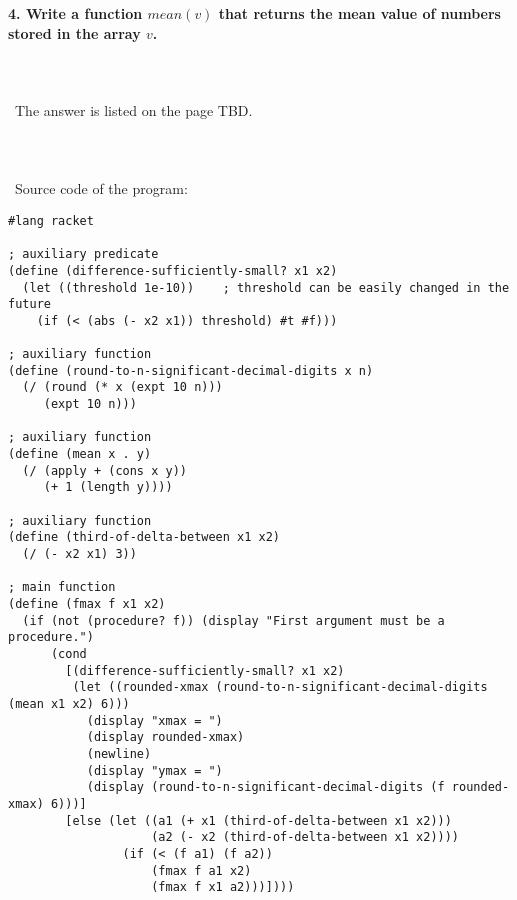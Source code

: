 \documentclass{article}
\begin{document}
\paragraph{}\
\paragraph{}\



\paragraph{4. Write a function \(mean(v)\) that returns the mean value of numbers stored in the array \(v\).}\

\paragraph{}\
	The answer is listed on the page TBD.
\paragraph{}\

\paragraph{}\
Source code of the program:

\begin{verbatim}
#lang racket

; auxiliary predicate
(define (difference-sufficiently-small? x1 x2)
  (let ((threshold 1e-10))    ; threshold can be easily changed in the future
    (if (< (abs (- x2 x1)) threshold) #t #f)))

; auxiliary function
(define (round-to-n-significant-decimal-digits x n)
  (/ (round (* x (expt 10 n)))
     (expt 10 n)))

; auxiliary function
(define (mean x . y)
  (/ (apply + (cons x y))
     (+ 1 (length y))))

; auxiliary function
(define (third-of-delta-between x1 x2)
  (/ (- x2 x1) 3))

; main function
(define (fmax f x1 x2)
  (if (not (procedure? f)) (display "First argument must be a procedure.")
      (cond
        [(difference-sufficiently-small? x1 x2)
         (let ((rounded-xmax (round-to-n-significant-decimal-digits (mean x1 x2) 6)))
           (display "xmax = ")
           (display rounded-xmax)
           (newline)
           (display "ymax = ")
           (display (round-to-n-significant-decimal-digits (f rounded-xmax) 6)))]
        [else (let ((a1 (+ x1 (third-of-delta-between x1 x2)))
                    (a2 (- x2 (third-of-delta-between x1 x2))))
                (if (< (f a1) (f a2))
                    (fmax f a1 x2)
                    (fmax f x1 a2)))])))
\end{verbatim}
\end{document}
